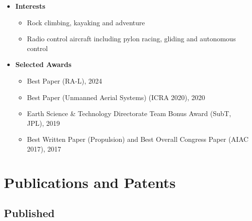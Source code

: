 \documentclass[12pt,letter,sans]{moderncv}
\begin{document}
\begin{itemize}

\vspace{4pt}

\item
{
    \textbf{Interests}
        \vspace{3pt} 
        \begin{itemize}
            \item Rock climbing, kayaking and adventure
            \item Radio control aircraft including pylon racing, gliding and autonomous control
        \end{itemize}
}

\vspace{4pt}
   
\item
{
    \textbf{Selected Awards}
        \vspace{3pt} 
        \begin{itemize}
            \item Best Paper (RA-L), 2024
            \item Best Paper (Unmanned Aerial Systems) (ICRA 2020), 2020
            \item Earth Science \& Technology Directorate Team Bonus Award (SubT, JPL), 2019
            \item Best Written Paper (Propulsion) and Best Overall Congress Paper (AIAC 2017), 2017
        \end{itemize}
}    
    
\end{itemize}

\newpage

\section{Publications and Patents}
\subsection{Published}
\end{document}
